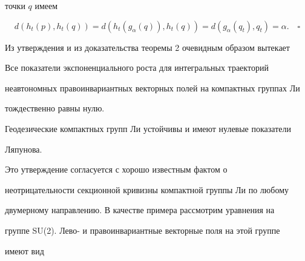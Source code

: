 точки $q$ имеем 


$$ 


d(h_t(p),h_t(q))=d(h_t(g_\alpha(q)),h_t(q))= 


d(g_\alpha(q_t),q_t)=\alpha.\quad\square 


$$ 


 


Из утверждения и из доказательства теоремы 2 очевидным образом вытекает 


 


\begin{cor} 


Все показатели экспоненциального роста для интегральных траекторий 


неавтономных правоинвариантных векторных полей на компактных группах Ли 


тождественно равны нулю. 


\end{cor} 


 


\begin{cor} 


Геодезические компактных групп Ли устойчивы и имеют нулевые показатели 


Ляпунова. 


\end{cor} 


 


Это утверждение согласуется с хорошо известным фактом о 


неотрицательности секционной кривизны компактной группы Ли по любому 


двумерному направлению. В качестве примера рассмотрим уравнения на 


группе SU(2). Лево- и правоинвариантные векторные поля на этой группе 


имеют вид 


